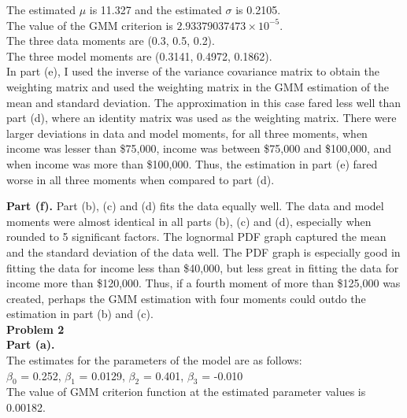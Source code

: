 \documentclass[letterpaper,12pt]{article}
\theoremstyle{definition}
\begin{document}
The estimated $\mu$ is 11.327 and the estimated $\sigma$ is 0.2105.\\
The value of the GMM criterion is $2.93379037473 \times 10^{-5}$. \\
The three data moments are (0.3, 0.5, 0.2).\\
The three model moments are (0.3141, 0.4972, 0.1862).\\
In part (e), I used the inverse of the variance covariance matrix to obtain the weighting matrix and used the weighting matrix in the GMM estimation of the mean and standard deviation. The approximation in this case fared less well than part (d), where an identity matrix was used as the weighting matrix. There were larger deviations in data and model moments, for all three moments, when income was lesser than \$75,000, income was between \$75,000 and \$100,000, and when income was more than \$100,000. Thus, the estimation in part (e) fared worse in all three moments when compared to part (d). 

\pagebreak

\textbf{Part (f).}
\flushleft
Part (b), (c) and (d) fits the data equally well. The data and model moments were almost identical in all parts (b), (c) and (d), especially when rounded to 5 significant factors. The lognormal PDF graph captured the mean and the standard deviation of the data well. The PDF graph is especially good in fitting the data for income less than \$40,000, but less great in fitting the data for income more than \$120,000. Thus, if a fourth moment of more than \$125,000 was created, perhaps the GMM estimation with four moments could outdo the estimation in part (b) and (c). \\
\flushleft
\noindent\textbf{Problem 2}\\
\textbf{Part (a).} \\
\flushleft 
The estimates for the parameters of the model are as follows: \\
$\beta_0$ = 0.252, $\beta_1$ = 0.0129, $\beta_2$ = 0.401, $\beta_3$ = -0.010\\
The value of GMM criterion function at the estimated parameter values is 0.00182.
\end{document}
